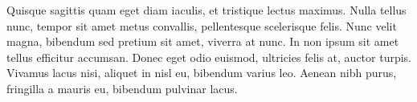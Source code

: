 \documentclass[a4paper,11pt]{article}
\begin{document}
Quisque sagittis quam eget diam iaculis, et tristique lectus maximus.
Nulla tellus nunc, tempor sit amet metus convallis, pellentesque
scelerisque felis. Nunc velit magna, bibendum sed pretium sit amet,
viverra at nunc. In non ipsum sit amet tellus efficitur accumsan. Donec
eget odio euismod, ultricies felis at, auctor turpis. Vivamus lacus
nisi, aliquet in nisl eu, bibendum varius leo. Aenean nibh purus,
fringilla a mauris eu, bibendum pulvinar lacus.


\printbibliography
\end{document}
